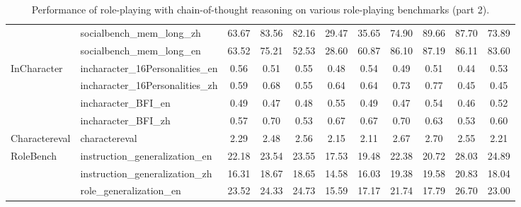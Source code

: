 \begin{table*}[ht]
{\begin{tabular}{llccccccccc}
 & socialbench\_mem\_long\_zh & 63.67 & 83.56 & 82.16 & 29.47 & 35.65 & 74.90 & 89.66 & 87.70 & 73.89 \\
 & socialbench\_mem\_long\_en & 63.52 & 75.21 & 52.53 & 28.60 & 60.87 & 86.10 & 87.19 & 86.11 & 83.60 \\
 \midrule
\multirow{4}{*}{InCharacter} & incharacter\_16Personalities\_en & 0.56 & 0.51 & 0.55 & 0.48 & 0.54 & 0.49 & 0.51 & 0.44 & 0.53 \\
 & incharacter\_16Personalities\_zh & 0.59 & 0.68 & 0.55 & 0.64 & 0.64 & 0.73 & 0.77 & 0.45 & 0.45 \\
 & incharacter\_BFI\_en & 0.49 & 0.47 & 0.48 & 0.55 & 0.49 & 0.47 & 0.54 & 0.46 & 0.52 \\
 & incharacter\_BFI\_zh & 0.57 & 0.70 & 0.53 & 0.67 & 0.67 & 0.70 & 0.63 & 0.53 & 0.60 \\
 \midrule
Charactereval & charactereval & 2.29 & 2.48 & 2.56 & 2.15 & 2.11 & 2.67 & 2.70 & 2.55 & 2.21 \\
\midrule
\multirow{3}{*}{RoleBench} & instruction\_generalization\_en & 22.18 & 23.54 & 23.55 & 17.53 & 19.48 & 22.38 & 20.72 & 28.03 & 24.89 \\
 & instruction\_generalization\_zh & 16.31 & 18.67 & 18.65 & 14.58 & 16.03 & 19.38 & 19.58 & 20.83 & 18.04 \\
 & role\_generalization\_en & 23.52 & 24.33 & 24.73 & 15.59 & 17.17 & 21.74 & 17.79 & 26.70 & 23.00 \\
\bottomrule
\end{tabular}%
}
\caption{Performance of role-playing with chain-of-thought reasoning on various role-playing benchmarks (part 2).}
\label{tab:cot_performance_part_2}
\end{table*}





